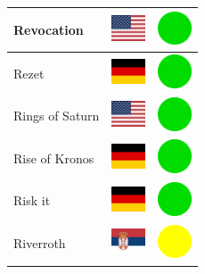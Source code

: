 \documentclass[12pt, a4paper, twoside]{report}
\begin{document}
\begin{center}
\begin{longtable}{|p{5cm}|p{2cm}|p{2cm}|}
Revocation & \includegraphics[width=1cm]{4x3/us} & \includegraphics[width=1cm]{likes/y} \\ \hline
Rezet & \includegraphics[width=1cm]{4x3/de} & \includegraphics[width=1cm]{likes/y} \\ \hline
Rings of Saturn & \includegraphics[width=1cm]{4x3/us} & \includegraphics[width=1cm]{likes/y} \\ \hline
Rise of Kronos & \includegraphics[width=1cm]{4x3/de} & \includegraphics[width=1cm]{likes/y} \\ \hline
Risk it & \includegraphics[width=1cm]{4x3/de} & \includegraphics[width=1cm]{likes/y} \\ \hline
Riverroth & \includegraphics[width=1cm]{4x3/rs} & \includegraphics[width=1cm]{likes/m} \\ \hline

\end{longtable}
\end{center}
\end{document}
